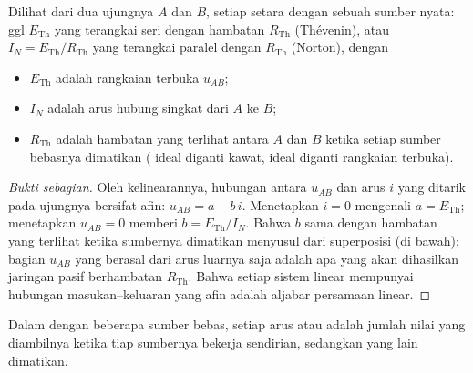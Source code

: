 \begin{theorem}\label{thm:b1:dc-circuits:thevenin}
Dilihat dari dua ujungnya $A$ dan $B$, setiap  setara
dengan sebuah sumber nyata: ggl $E_{\mathrm{Th}}$ yang terangkai seri
dengan hambatan $R_{\mathrm{Th}}$ (Thévenin), atau  $I_N =
E_{\mathrm{Th}}/R_{\mathrm{Th}}$ yang terangkai paralel dengan
$R_{\mathrm{Th}}$ (Norton), dengan
\begin{itemize}
  \item $E_{\mathrm{Th}}$ adalah  rangkaian terbuka $u_{AB}$;
  \item $I_N$ adalah arus hubung singkat dari $A$ ke $B$;
  \item $R_{\mathrm{Th}}$ adalah hambatan yang terlihat antara $A$ dan
        $B$ ketika setiap sumber bebasnya dimatikan (
        ideal diganti kawat,  ideal diganti rangkaian
        terbuka).
\end{itemize}
\end{theorem}

\begin{proof}[Bukti sebagian]
Oleh kelinearannya, hubungan antara  $u_{AB}$ dan arus $i$ yang
ditarik pada ujungnya bersifat afin: $u_{AB} = a - b\,i$. Menetapkan
$i = 0$ mengenali $a = E_{\mathrm{Th}}$; menetapkan $u_{AB} = 0$ memberi
$b = E_{\mathrm{Th}}/I_N$. Bahwa $b$ sama dengan hambatan yang terlihat
ketika sumbernya dimatikan menyusul dari superposisi (di bawah): bagian
$u_{AB}$ yang berasal dari arus luarnya saja adalah apa yang akan
dihasilkan jaringan pasif berhambatan $R_{\mathrm{Th}}$. Bahwa setiap
sistem linear mempunyai hubungan masukan--keluaran yang afin adalah
aljabar persamaan linear.
\end{proof}

\begin{theorem}[Superposisi]\label{thm:b1:dc-circuits:superposition}
Dalam  dengan beberapa sumber bebas, setiap arus atau
 adalah jumlah nilai yang diambilnya ketika tiap sumbernya
bekerja sendirian, sedangkan yang lain dimatikan.
\end{theorem}

